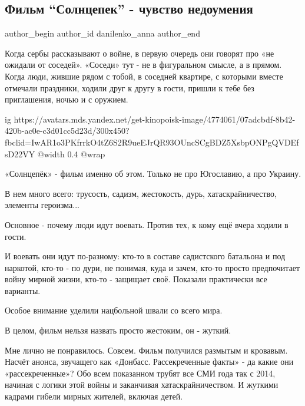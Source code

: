  
 
 
 
 
 
\subsection{Фильм \enquote{Солнцепек} - чувство недоумения}
\label{sec:19_08_2021.fb.danilenko_anna.1.film_solncepek_nedoumenie}
 
\ifcmt
 author_begin
   author_id danilenko_anna
 author_end
\fi

Когда сербы рассказывают о войне, в первую очередь они говорят про «не ожидали
от соседей». «Соседи» тут - не в фигуральном смысле, а в прямом. Когда люди,
жившие рядом с тобой, в соседней квартире, с которыми вместе отмечали
праздники, ходили друг к другу в гости, пришли к тебе без приглашения, ночью и
с оружием.

\ifcmt
  ig https://avatars.mds.yandex.net/get-kinopoisk-image/4774061/07adcbdf-8b42-420b-ac0e-c3d01cc5d23d/300x450?fbclid=IwAR1o3PKfrrkO4tZ6S2R9ueEJrQR93OUncSCgBDZ5XsbpONPgQVDEfsD22VY
  @width 0.4
  @wrap \parpic[r]
\fi

«Солнцепёк» - фильм именно об этом. Только не про Югославию, а про Украину.

В нем много всего: трусость, садизм, жестокость, дурь, хатаскрайничество, элементы героизма...

Основное - почему люди идут воевать. Против тех, к кому ещё вчера ходили в гости.

И воевать они идут по-разному: кто-то в составе садистского батальона и под
наркотой, кто-то - по дури, не понимая, куда и зачем, кто-то просто
предпочитает войну мирной жизни, кто-то - защищает своё. Показали практически
все варианты.

Особое внимание уделили нацбольной швали со всего мира. 

В целом, фильм нельзя назвать просто жестоким, он - жуткий.

Мне лично не понравилось. Совсем. Фильм получился размытым и кровавым. Насчёт
анонса, звучащего как «Донбасс. Рассекреченные факты» - да какие они
«рассекреченные»? Обо всем показанном трубят все СМИ года так с 2014, начиная с
логики этой войны и заканчивая хатаскрайничеством. И жуткими кадрами гибели
мирных жителей, включая детей.

